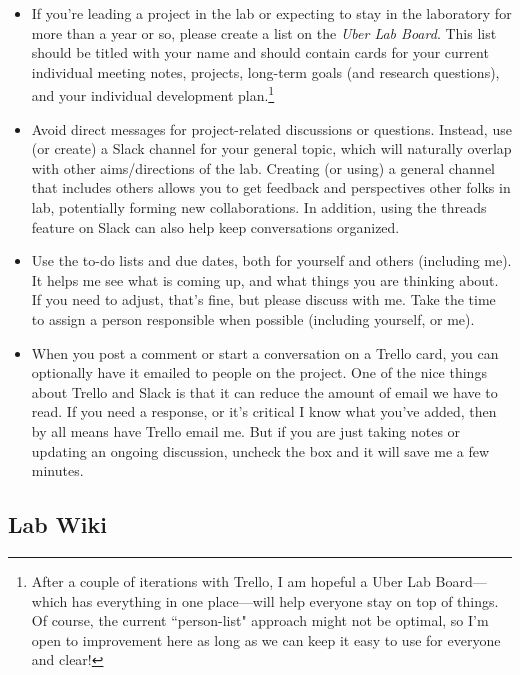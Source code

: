 \documentclass[letterpaper,12pt,oneside]{memoir}
\begin{document}
\begin{itemize}
\item If you're leading a project in the lab or expecting to stay in the laboratory for more than a year or so, please create a list on the \textit{Uber Lab Board}. This list should be titled with your name and should contain cards for your current individual meeting notes, projects, long-term goals (and research questions), and your individual development plan.\footnote{After a couple of iterations with Trello, I am hopeful a Uber Lab Board---which has everything in one place---will help everyone stay on top of things. Of course, the current ``person-list" approach might not be optimal, so I'm open to improvement here as long as we can keep it easy to use for everyone and clear!}

\item Avoid direct messages for project-related discussions or questions. Instead, use (or create) a Slack channel for your general topic, which will naturally overlap with other aims/directions of the lab. Creating (or using) a general channel that includes others allows you to get feedback and perspectives other folks in lab, potentially forming new collaborations. In addition, using the threads feature on Slack can also help keep conversations organized.

\item Use the to-do lists and due dates, both for yourself and others (including me). It helps me see what is coming up, and what things you are thinking about. If you need to adjust, that's fine, but please discuss with me. Take the time to assign a person responsible when possible (including yourself, or me).

\item When you post a comment or start a conversation on a Trello card, you can optionally have it emailed to people on the project. One of the nice things about Trello and Slack is that it can reduce the amount of email we have to read. If you need a response, or it's critical I know what you've added, then by all means have Trello email me. But if you are just taking notes or updating an ongoing discussion, uncheck the box and it will save me a few minutes.

\end{itemize}


\subsection{Lab Wiki}
\end{document}
